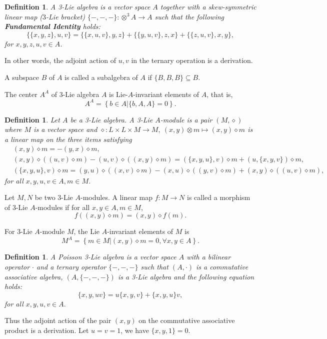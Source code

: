 \documentclass[11pt]{article}
\newtheorem{definition}[theorem]{Definition}
\def\di{\diamond}
\def\ot{\otimes}
\begin{document}
\begin{definition}\cite{Filippov}
  A 3-Lie algebra is a vector space $A$ together with a skew-symmetric linear map ($3$-Lie bracket) $\{-,-,-\}:
\otimes^3 A\rightarrow A$ such that the following {\bf Fundamental Identity} holds:
\begin{equation}
\{\{x,y,z\},u,v\}=\{\{x,u,v\},y,z\}+\{\{y,u,v\},z,x\}+\{\{z,u,v\},x,y\},\label{1a}
\end{equation}
for $x, y, z, u, v\in A$.
\end{definition}
In other words, the adjoint action of $u,v$ in the ternary operation is a derivation.

A subspace $B$ of $A$ is called a subalgebra of $A$ if $\{B,B,B\}\subseteq B$.

The center $A^A$ of  3-Lie algebra $A$ is Lie-$A$-invariant elements of $A$, that is, 
$$A^A=\left\{b\in A|\{b,A,A\}=0\right\}.$$

\begin{definition}\cite{Ma}
Let $A$ be a 3-Lie algebra. A 3-Lie $A$-module is a pair $(M,\di)$ where $M$ is a vector space and $\di:L\times L\times M\rightarrow M,\ (x, y)\ot m\mapsto(x,y)\di m$ is a linear map on the three items satisfying 
\begin{align}
&(x, y)\di m=-(y, x)\di m,\label{1b}\\
&(x, y)\di((u,v)\di m)-(u,v)\di((x, y)\di m)=(\{x,y,u\},v)\di m+(u,\{x,y,v\})\di m,\label{1c}\\
&(\{x,y,u\},v)\di m=(y,u)\di((x,v)\di m)-(x,u)\di((y,v)\di m)+(x,y)\di((u,v)\di m),\label{1d}
\end{align}
for all $x,y,u,v\in A,m\in M$.
\end{definition}

Let $M,N$ be two  3-Lie $A$-modules. A linear map $f:M\rightarrow N$ is called a morphism of 3-Lie $A$-modules if for all $x,y\in A,m\in M$,
$$f((x,y)\di m)=(x,y)\di f(m).$$

For 3-Lie $A$-module $M$, the Lie $A$-invariant elements of $M$ is
$$M^A=\left\{m\in M|(x,y)\di m=0,\forall x,y\in A\right\}.$$

\begin{definition}\cite{Dz}
 A Poisson 3-Lie algebra is a vector space $A$ with a bilinear operator $\cdot$ and a ternary operator $\{-,-,-\}$ such that $(A,\cdot)$ is a commutative associative algebra, $(A, \{-,-,-\})$ is a 3-Lie algebra and the following equation holds:
\begin{equation}
\{x,y,uv\}=u \{x,y,v\}+\{x,y,u\} v,\label{1e}
\end{equation}
for all $x,y,u,v\in A.$
\end{definition}
Thus the adjoint action of the pair $(x,y)$ on the commutative associative product is a derivation. Let $u=v=1$, we have $\{x,y,1\}=0$.
\end{document}
